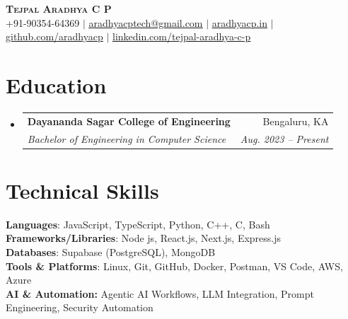 \documentclass[letterpaper,11pt]{article}
\makeatletter
\newcommand{\resumeSubheading}[4]{
  \vspace{-2pt}\item
    \begin{tabular*}{0.97\textwidth}[t]{l@{\extracolsep{\fill}}r}
      \textbf{#1} & #2 \\
      \textit{\small#3} & \textit{\small #4} \\
    \end{tabular*}\vspace{-7pt}
}
\newcommand{\resumeSubHeadingListStart}{\begin{itemize}[leftmargin=0.15in, label={}]}
\newcommand{\resumeSubHeadingListEnd}{\end{itemize}}
\makeatother
\begin{document}

\begin{center}
    \textbf{\Huge \scshape Tejpal Aradhya C P} \\ \vspace{1pt}
    \small +91-90354-64369 $|$ 
    \href{mailto:aradhyacptech@gmail.com}{\underline{aradhyacptech@gmail.com}} $|$ 
    \href{https://aradhyacp.in}{\underline{aradhyacp.in}} $|$
    \href{https://github.com/aradhyacp}{\underline{github.com/aradhyacp}} $|$
    \href{https://www.linkedin.com/in/tejpal-aradhya-c-p-8280b3292}{\underline{linkedin.com/tejpal-aradhya-c-p}}
\end{center}


\section{Education}
  \resumeSubHeadingListStart
    \resumeSubheading
      {Dayananda Sagar College of Engineering}{Bengaluru, KA}
      {Bachelor of Engineering in Computer Science}{Aug. 2023 -- Present}
  \resumeSubHeadingListEnd

\section{Technical Skills}
\begin{itemize}[leftmargin=0.15in, label={}, topsep=0pt, itemsep=0pt]
\small{\item{
\textbf{Languages}{: JavaScript, TypeScript, Python, C++, C, Bash} \\
\textbf{Frameworks/Libraries}{: Node js, React.js, Next.js, Express.js} \\
\textbf{Databases}{: Supabase (PostgreSQL), MongoDB} \\
\textbf{Tools \& Platforms}{: Linux, Git, GitHub, Docker, Postman, VS Code, AWS, Azure} \\
\textbf{AI \& Automation:} {Agentic AI Workflows, LLM Integration, Prompt Engineering, Security Automation}
}}
\end{itemize}
\end{document}
